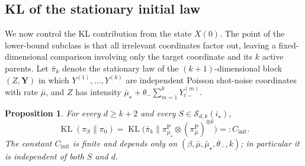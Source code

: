 \documentclass{article}
\newtheorem{proposition}{Proposition}[section]
\newcommand{\KL}{\operatorname{KL}}
\newcommand{\thetalo}{\theta_-}
\begin{document}
\subsection{KL of the stationary initial law}\label{app:lower-initial}

We now control the KL contribution from the state $X(0)$.
The point of the lower-bound subclass is that all irrelevant coordinates factor
out, leaving a fixed-dimensional comparison involving only the target coordinate
and its $k$ active parents.
Let \(\bar\pi_k\) denote the stationary law of the \((k+1)\)-dimensional block
\((Z,\mathbf Y)\) in which \(Y^{(1)},\dots,Y^{(k)}\) are independent
Poisson shot-noise coordinates with rate \(\bar\mu\), and \(Z\) has intensity
\(\bar\mu_\star+\thetalo\sum_{m=1}^k Y^{(m)}_{t-}\).

\begin{proposition}
\label{prop:app-initKL-k}
For every $d\ge k+2$ and every $S\in\mathcal S_{d,k}(i_\star)$,
\[
\KL(\pi_S\|\pi_0)
=
\KL\!\bigl(\bar\pi_k\|\pi_{\bar\mu_\star}^{\mathrm P}\otimes
(\pi_{\bar\mu}^{\mathrm P})^{\otimes k}\bigr)
=:C_{\mathrm{init}}.
\]
The constant $C_{\mathrm{init}}$ is finite and depends only on
$(\beta,\bar\mu,\bar\mu_\star,\thetalo,k)$; in particular it is independent of
both $S$ and $d$.
\end{proposition}
\end{document}

